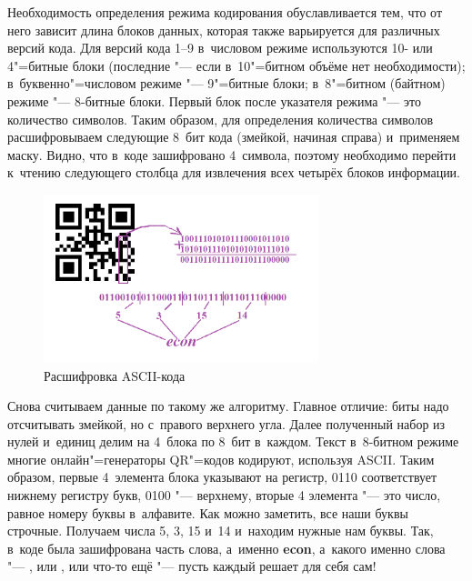 \documentclass[final,pdftex]{../../template/epsilonj}
\begin{document}
Необходимость определения режима кодирования обуславливается тем, что от него зависит длина блоков данных, которая также варьируется для различных версий кода. Для версий кода 1--9 в~числовом режиме используются 10- или 4"=битные блоки (последние "--- если в~10"=битном объёме нет необходимости); в~буквенно"=числовом режиме "--- 9"=битные блоки; в~8"=битном (байтном) режиме "--- 8-битные блоки. Первый блок после указателя режима "--- это количество символов. Таким образом, для определения количества символов расшифровываем следующие 8~бит кода (змейкой, начиная справа) и~применяем маску. Видно, что в~коде зашифровано 4~символа, поэтому необходимо перейти к~чтению следующего столбца для извлечения всех четырёх блоков информации.

\begin{figure}[htbp]
	\includegraphics[width=80mm]{41.png}
	\caption{Расшифровка ASCII-кода}
\end{figure}

Снова считываем данные по такому же алгоритму. Главное отличие: биты надо отсчитывать змейкой, но с~правого верхнего угла. Далее полученный набор из нулей и~единиц делим на 4~блока по 8~бит в~каждом. Текст в~8-битном режиме многие онлайн"=генераторы QR"=кодов кодируют, используя ASCII. Таким образом, первые 4~элемента блока указывают на регистр, 0110 соответствует нижнему регистру букв, 0100 "--- верхнему, вторые 4 элемента "--- это число, равное номеру буквы в~алфавите. Как можно заметить, все наши буквы строчные. Получаем числа 5, 3, 15 и~14 и~находим нужные нам буквы. Так, в~коде была зашифрована часть слова, а~именно \textbf{econ}, а~какого именно слова "--- , или , или что-то ещё "--- пусть каждый решает для себя сам!
\end{document}
